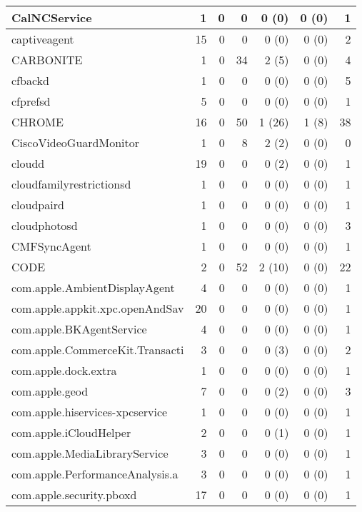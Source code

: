 \begin{adjustwidth}{-2in}{}
\begin{scriptsize}
\begin{longtable}[l]{ l | r | r | r | r | r | r }
    CalNCService & 1 &  0 &  0 &  0 (0) &  0 (0) &  1 \\ \hline
    captiveagent &  15 &  0 &  0 &  0 (0) &  0 (0) &  2 \\ \hline
    CARBONITE &  1 &  0 & 34 &  2 (5) &  0 (0) &  4 \\ \hline
    cfbackd &  1 &  0 &  0 &  0 (0) &  0 (0) &  5 \\ \hline
    cfprefsd & 5 &  0 &  0 &  0 (0) &  0 (0) &  1 \\ \hline
    CHROME &  16 &  0 & 50 & 1 (26) &  1 (8) & 38 \\ \hline
    CiscoVideoGuardMonitor & 1 &  0 &  8 &  2 (2) &  0 (0) &  0 \\ \hline
    cloudd &  19 &  0 &  0 &  0 (2) &  0 (0) &  1 \\ \hline
    cloudfamilyrestrictionsd & 1 &  0 &  0 &  0 (0) &  0 (0) &  1 \\ \hline
    cloudpaird & 1 &  0 &  0 &  0 (0) &  0 (0) &  1 \\ \hline
    cloudphotosd & 1 &  0 &  0 &  0 (0) &  0 (0) &  3 \\ \hline
    CMFSyncAgent & 1 &  0 &  0 &  0 (0) &  0 (0) &  1 \\ \hline
    CODE & 2 &  0 & 52 & 2 (10) &  0 (0) & 22 \\ \hline
    com.apple.AmbientDisplayAgent &  4 &  0 &  0 &  0 (0) &  0 (0) &  1 \\ \hline
    com.apple.appkit.xpc.openAndSav & 20 &  0 &  0 &  0 (0) &  0 (0) &  1 \\ \hline
    com.apple.BKAgentService & 4 &  0 &  0 &  0 (0) &  0 (0) &  1 \\ \hline
    com.apple.CommerceKit.Transacti &  3 &  0 &  0 &  0 (3) &  0 (0) &  2 \\ \hline
    com.apple.dock.extra & 1 &  0 &  0 &  0 (0) &  0 (0) &  1 \\ \hline
    com.apple.geod & 7 &  0 &  0 &  0 (2) &  0 (0) &  3 \\ \hline
    com.apple.hiservices-xpcservice &  1 &  0 &  0 &  0 (0) &  0 (0) &  1 \\ \hline
    com.apple.iCloudHelper & 2 &  0 &  0 &  0 (1) &  0 (0) &  1 \\ \hline
    com.apple.MediaLibraryService &  3 &  0 &  0 &  0 (0) &  0 (0) &  1 \\ \hline
    com.apple.PerformanceAnalysis.a &  3 &  0 &  0 &  0 (0) &  0 (0) &  1 \\ \hline
    com.apple.security.pboxd &  17 &  0 &  0 &  0 (0) &  0 (0) &  1 \\ \hline

\end{longtable}
\end{scriptsize}
\end{adjustwidth}
